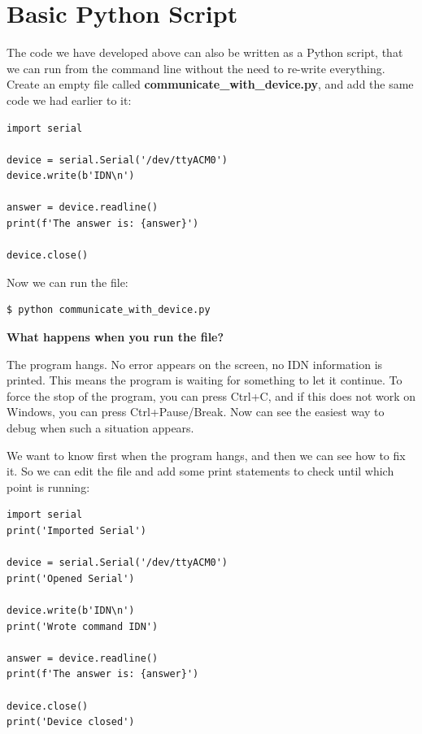 \section{Basic Python Script}
The code we have developed above can also be written as a Python script, that we can run from the command line without the need to re-write everything. Create an empty file called \textbf{communicate\_with\_device.py}, and add the same code we had earlier to it:

\begin{verbatim}
import serial

device = serial.Serial('/dev/ttyACM0')
device.write(b'IDN\n')

answer = device.readline()
print(f'The answer is: {answer}')

device.close()
\end{verbatim}

Now we can run the file:

\begin{verbatim}
$ python communicate_with_device.py
\end{verbatim}


\textbf{What happens when you run the file?}

The program hangs. No error appears on the screen, no IDN information is printed. This means the program is waiting for something to let it continue. To force the stop of the program, you can press Ctrl+C, and if this does not work on Windows, you can press Ctrl+Pause/Break. Now can see the easiest way to debug when such a situation appears. 

We want to know first when the program hangs, and then we can see how to fix it. So we can edit the file and add some print statements to check until which point is running:

\begin{verbatim}
import serial
print('Imported Serial')

device = serial.Serial('/dev/ttyACM0')
print('Opened Serial')

device.write(b'IDN\n')
print('Wrote command IDN')

answer = device.readline()
print(f'The answer is: {answer}')

device.close()
print('Device closed')
\end{verbatim}

